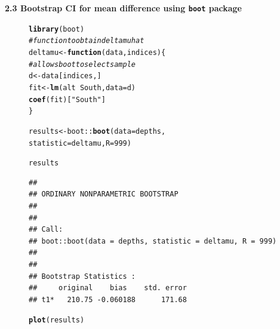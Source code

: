 \documentclass[10pt]{beamer}\usepackage[]{graphicx}\usepackage[]{color}
\makeatletter
\newcommand{\hlnum}[1]{\textcolor[rgb]{0.686,0.059,0.569}{#1}}%
\newcommand{\hlstr}[1]{\textcolor[rgb]{0.192,0.494,0.8}{#1}}%
\newcommand{\hlcom}[1]{\textcolor[rgb]{0.678,0.584,0.686}{\textit{#1}}}%
\newcommand{\hlopt}[1]{\textcolor[rgb]{0,0,0}{#1}}%
\newcommand{\hlstd}[1]{\textcolor[rgb]{0.345,0.345,0.345}{#1}}%
\newcommand{\hlkwa}[1]{\textcolor[rgb]{0.161,0.373,0.58}{\textbf{#1}}}%
\newcommand{\hlkwb}[1]{\textcolor[rgb]{0.69,0.353,0.396}{#1}}%
\newcommand{\hlkwc}[1]{\textcolor[rgb]{0.333,0.667,0.333}{#1}}%
\newcommand{\hlkwd}[1]{\textcolor[rgb]{0.737,0.353,0.396}{\textbf{#1}}}%
\newenvironment{kframe}{%
 \def\at@end@of@kframe{}%
 \ifinner\ifhmode%
  \def\at@end@of@kframe{\end{minipage}}%
  \begin{minipage}{\columnwidth}%
 \fi\fi%
 \def\FrameCommand##1{\hskip\@totalleftmargin \hskip-\fboxsep
 \colorbox{shadecolor}{##1}\hskip-\fboxsep
     \hskip-\linewidth \hskip-\@totalleftmargin \hskip\columnwidth}%
 \MakeFramed {\advance\hsize-\width
   \@totalleftmargin\z@ \linewidth\hsize
   \@setminipage}}%
 {\par\unskip\endMakeFramed%
 \at@end@of@kframe}
\newenvironment{knitrout}{}{} %
\makeatother
\begin{document}
\begin{frame}
		\textbf{2.3 Bootstrap CI for mean difference using \texttt{boot} package}
\begin{figure}
	\begin{minipage}[h]{0.40\linewidth}
\begin{knitrout}\tiny
{}\color{fgcolor}\begin{kframe}
\begin{alltt}
\hlkwd{library}\hlstd{(boot)}
\hlcom{# function to obtain deltamu hat}
\hlstd{deltamu} \hlkwb{<-} \hlkwa{function}\hlstd{(}\hlkwc{data}\hlstd{,} \hlkwc{indices}\hlstd{) \{}
        \hlcom{# allows boot to select sample}
        \hlstd{d} \hlkwb{<-} \hlstd{data[indices,]}
        \hlstd{fit} \hlkwb{<-} \hlkwd{lm}\hlstd{(alt} \hlopt{~} \hlstd{South,} \hlkwc{data}\hlstd{=d)}
        \hlkwd{coef}\hlstd{(fit)[}\hlstr{"South"}\hlstd{]}
\hlstd{\}}

\hlstd{results} \hlkwb{<-} \hlstd{boot}\hlopt{::}\hlkwd{boot}\hlstd{(}\hlkwc{data} \hlstd{= depths,}
\hlkwc{statistic} \hlstd{= deltamu,} \hlkwc{R}\hlstd{=}\hlnum{999}\hlstd{)}

\hlstd{results}
\end{alltt}
\begin{verbatim}
## 
## ORDINARY NONPARAMETRIC BOOTSTRAP
## 
## 
## Call:
## boot::boot(data = depths, statistic = deltamu, R = 999)
## 
## 
## Bootstrap Statistics :
##     original    bias    std. error
## t1*   210.75 -0.060188      171.68
\end{verbatim}
\end{kframe}
\end{knitrout}
		
	\end{minipage}
	\hspace{0.4cm}
	\begin{minipage}[h]{0.50\linewidth}
\begin{knitrout}\tiny
{}\color{fgcolor}\begin{kframe}
\begin{alltt}
\hlkwd{plot}\hlstd{(results)}
\end{alltt}
\end{kframe}


\end{knitrout}
\end{minipage}
\end{figure}
\end{frame}
\end{document}
